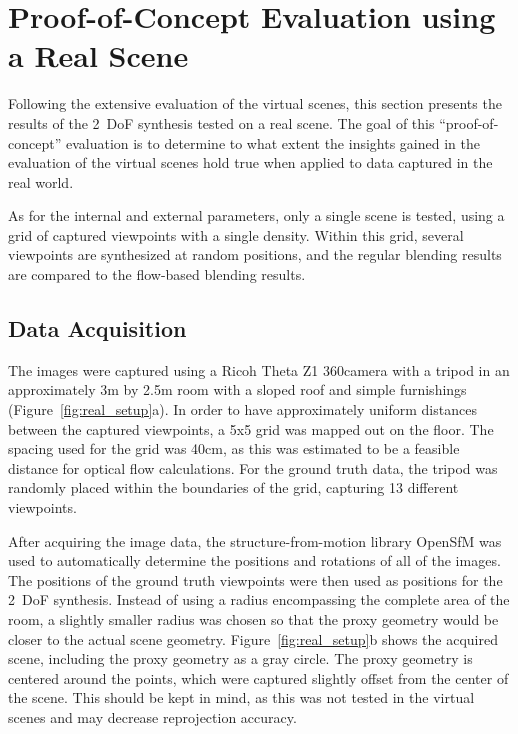 \section{Proof-of-Concept Evaluation using a Real Scene} \label{sec:pof_eval}
Following the extensive evaluation of the virtual scenes, this section presents the results of the 2~DoF synthesis tested on a real scene. The goal of this ``proof-of-concept'' evaluation is to determine to what extent the insights gained in the evaluation of the virtual scenes hold true when applied to data captured in the real world.

As for the internal and external parameters, only a single scene is tested, using a grid of captured viewpoints with a single density. Within this grid, several viewpoints are synthesized at random positions, and the regular blending results are compared to the flow-based blending results.

\subsection{Data Acquisition}
The images were captured using a Ricoh Theta Z1 360\degree camera with a tripod in an approximately 3m by 2.5m room with a sloped roof and simple furnishings (Figure~\ref{fig:real_setup}a). In order to have approximately uniform distances between the captured viewpoints, a 5x5 grid was mapped out on the floor. The spacing used for the grid was 40cm, as this was estimated to be a feasible distance for optical flow calculations. For the ground truth data, the tripod was randomly placed within the boundaries of the grid, capturing 13 different viewpoints.

After acquiring the image data, the structure-from-motion library OpenSfM \cite{opensfm} was used to automatically determine the positions and rotations of all of the images. The positions of the ground truth viewpoints were then used as positions for the 2~DoF synthesis.
Instead of using a radius encompassing the complete area of the room, a slightly smaller radius was chosen so that the proxy geometry would be closer to the actual scene geometry. Figure~\ref{fig:real_setup}b shows the acquired scene, including the proxy geometry as a gray circle. The proxy geometry is centered around the points, which were captured slightly offset from the center of the scene. This should be kept in mind, as this was not tested in the virtual scenes and may decrease reprojection accuracy.

